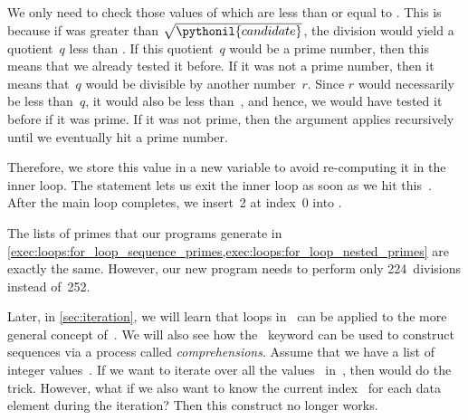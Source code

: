 We only need to check those values of  which are less than or equal to .
This is because if  was greater than $\sqrt{\pythonil{candidate}}$, the division would yield a quotient~$q$ less than .
If this quotient~$q$ would be a prime number, then this means that we already tested it before.
If it was not a prime number, then it means that~$q$ would be divisible by another number~$r$.
Since $r$ would necessarily be less than~$q$, it would also be less than~, and hence, we would have tested it before if it was prime.
If it was not prime, then the argument applies recursively until we eventually hit a prime number.

Therefore, we store this value in a new variable  to avoid re-computing it in the inner loop.
The  statement lets us exit the inner loop as soon as we hit this~.
After the main loop completes, we insert~2 at index~0 into .

The lists of primes that our programs generate in \cref{exec:loops:for_loop_sequence_primes,exec:loops:for_loop_nested_primes} are exactly the same.
However, our new program needs to perform only 224~divisions instead of~252.

Later, in \cref{sec:iteration}, we will learn that loops in \python\ can be applied to the more general concept of~.
We will also see how the ~keyword can be used to construct sequences via a process called \emph{comprehensions}.%
%
\FloatBarrier%
\endhsection%
%
%
\label{sec:enumOverSequences}%
%
%
%
%
%
%
%
Assume that we have a list  of integer values~.
If we want to iterate over all the values~ in~, then  would do the trick.
However, what if we also want to know the current index~ for each data element during the iteration?
Then this construct no longer works.

